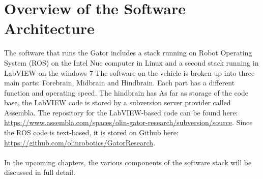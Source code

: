 \documentclass[12pt]{report}
\begin{document}
\renewcommand{\thefootnote}{\arabic{footnote}}



\tableofcontents

\newpage

\listoffigures

\newpage

\listoftables

\newpage

\newpage

\newpage

\newpage
%
\chapter{Overview of the Software Architecture}
The software that runs the Gator includes a stack running on Robot Operating System (ROS) on the Intel Nuc computer in Linux and a second stack running in LabVIEW on the windows 7 %
%
\noindent The software on the vehicle is broken up into three main parts: Forebrain, Midbrain and Hindbrain. Each part has a different function and operating speed. The hindbrain has %
%
As far as storage of the code base, the LabVIEW code is stored by a subversion server provider called Assembla. The repository for the LabVIEW-based code can be found here: \url{https://www.assembla.com/spaces/olin-gator-research/subversion/source}. Since the ROS code is text-based, it is stored on Github here: \url{https://github.com/olinrobotics/GatorResearch}. \\ \\
%
In the upcoming chapters, the various components of the software stack will be discussed in full detail.

\newpage

\newpage

\newpage

\end{document}
